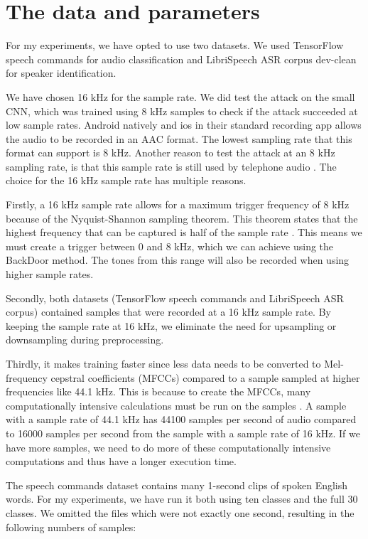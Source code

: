 \documentclass{report}
\theoremstyle{definition}
\theoremstyle{remark}
\begin{document}
\section{The data and parameters \label{DATANADPARAM}}
For my experiments, we have opted to use two datasets. We used TensorFlow speech commands \cite{Speech_commands} for audio classification and LibriSpeech ASR corpus dev-clean \cite{7178964} for speaker identification.

We have chosen 16 kHz for the sample rate. We did test the attack on the small CNN, which was trained using 8 kHz samples to check if the attack succeeded at low sample rates. Android natively \cite{AndroidMediaRecorder} and ios in their standard recording app \cite{Zeng_2019} allows the audio to be recorded in an AAC format. The lowest sampling rate that this format can support is 8 kHz. Another reason to test the attack at an 8 kHz sampling rate, is that this sample rate is still used by telephone audio \cite{rabiner1978digital}. The choice for the 16 kHz sample rate has multiple reasons.

Firstly, a 16 kHz sample rate allows for a maximum trigger frequency of 8 kHz because of the Nyquist-Shannon sampling theorem. This theorem states that the highest frequency that can be captured is half of the sample rate \cite{por2019nyquist}. This means we must create a trigger between 0 and 8 kHz, which we can achieve using the BackDoor method. The tones from this range will also be recorded when using higher sample rates. 

Secondly, both datasets (TensorFlow speech commands and LibriSpeech ASR corpus) contained samples that were recorded at a 16 kHz sample rate. By keeping the sample rate at 16 kHz, we eliminate the need for upsampling or downsampling during preprocessing. 

Thirdly, it makes training faster since less data needs to be converted to Mel-frequency cepstral coefficients (MFCCs) compared to a sample sampled at higher frequencies like 44.1 kHz. This is because to create the MFCCs, many computationally intensive calculations must be run on the samples \cite{1692543}. A sample with a sample rate of 44.1 kHz has 44100 samples per second of audio compared to 16000 samples per second from the sample with a sample rate of 16 kHz. If we have more samples, we need to do more of these computationally intensive computations and thus have a longer execution time. 

The speech commands dataset contains many 1-second clips of spoken English words. For my experiments, we have run it both using ten classes and the full 30 classes. We omitted the files which were not exactly one second, resulting in the following numbers of samples:
\end{document}
